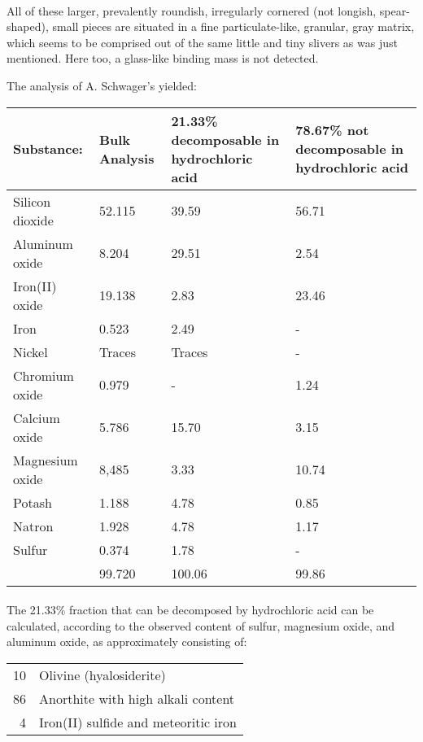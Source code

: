 \documentclass[a4paper, 12pt, oneside]{article}
\begin{document}
\paragraph{}
All of these larger, prevalently roundish, irregularly cornered (not longish, spear-shaped), small pieces are situated in a fine particulate-like, granular, gray matrix, which seems to be comprised out of the same little and tiny slivers as was just mentioned. Here too, a glass-like binding mass is not detected.

The analysis of A. Schwager's yielded:
\begin{center}
    \begin{tabular}{|l|p{1.75cm}|p{3.2cm}|p{2.7cm}|}
        \hline
        Substance: & Bulk Analysis & 21.33\% decomposable in hydrochloric acid & 78.67\% not decomposable in hydrochloric acid\\\hline
        Silicon dioxide & 52.115 & 39.59 & 56.71\\\hline
        Aluminum oxide & 8.204 & 29.51 & 2.54\\\hline
        Iron(II) oxide & 19.138 & 2.83 & 23.46\\\hline
        Iron & 0.523 & 2.49 & -\\\hline
        Nickel & Traces & Traces & -\\\hline
        Chromium oxide & 0.979 & - & 1.24\\\hline
        Calcium oxide & 5.786 & 15.70 & 3.15\\\hline
        Magnesium oxide & 8,485 & 3.33 & 10.74\\\hline
        Potash & 1.188 & 4.78 & 0.85\\\hline
        Natron & 1.928 & 4.78 & 1.17\\\hline
        Sulfur & 0.374 & 1.78 & -\\\hline
        & 99.720 & 100.06 & 99.86\\
        \hline
    \end{tabular}
\end{center}
\paragraph{}
The 21.33\% fraction that can be decomposed by hydrochloric acid can be calculated, according to the observed content of sulfur, magnesium oxide, and aluminum oxide, as approximately consisting of:
\begin{center}
    \begin{tabular}{r l}
        10 & Olivine (hyalosiderite)\\
        86 & Anorthite with high alkali content\\
        4 & Iron(II) sulfide and meteoritic iron\\
    \end{tabular}
\end{center}
\end{document}
